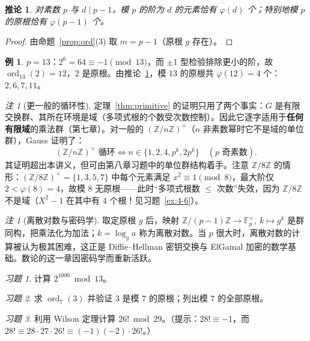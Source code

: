 \documentclass[a4paper,11pt]{ctexart}
\numberwithin{equation}{section}
\theoremstyle{plain}
\newtheorem{corollary}[theorem]{推论}
\theoremstyle{definition}
\newtheorem{example}[theorem]{例}
\theoremstyle{remark}
\newtheorem{remark}[theorem]{注}
\newtheorem{exercise}{习题}[section]
\newcommand{\Z}{\mathbb{Z}}
\newcommand{\F}{\mathbb{F}}
\DeclareMathOperator{\ord}{ord}
\begin{document}
\begin{corollary}\label{cor:countprim}
对素数 $p$ 与 $d\mid p-1$，模 $p$ 的阶为 $d$ 的元素恰有 $\varphi(d)$ 个；特别地模 $p$ 的原根恰有 $\varphi(p-1)$ 个。
\end{corollary}

\begin{proof}
由命题~\ref{prop:ord}(3) 取 $m=p-1$（原根 $g$ 存在）。
\end{proof}

\begin{example}
$p=13$：$2^6=64\equiv-1\pmod{13}$，而 $\pm1$ 型检验排除更小的阶，故 $\ord_{13}(2)=12$，$2$ 是原根。由推论~\ref{cor:countprim}，模 $13$ 的原根共 $\varphi(12)=4$ 个：$2,6,7,11$。
\end{example}

\begin{remark}[更一般的循环性]
定理~\ref{thm:primitive} 的证明只用了两个事实：$G$ 是有限交换群、其所在环境是域（多项式根的个数受次数控制）。因此它逐字适用于\textbf{任何有限域}的乘法群（第七章）。对一般的 $(\Z/n\Z)^{\times}$（$n$ 非素数幂时它不是域的单位群），Gauss 证明了：
\[
(\Z/n\Z)^{\times} \text{ 循环} \iff n\in\{1,2,4,p^k,2p^k\}\quad(p \text{ 奇素数}).
\]
其证明超出本讲义，但可由第八章习题中的单位群结构着手。注意 $\Z/8\Z$ 的情形：$(\Z/8\Z)^{\times}=\{1,3,5,7\}$ 中每个元素满足 $x^2\equiv1\pmod8$，最大阶仅 $2<\varphi(8)=4$，故模 $8$ 无原根——此时“多项式根数 $\le$ 次数”失效，因为 $\Z/8\Z$ 不是域（$X^2-1$ 在其中有 $4$ 个根！见习题~\ref{ex:4-6}）。
\end{remark}

\begin{remark}[离散对数与密码学]
取定原根 $g$ 后，映射 $\Z/(p-1)\Z\to\F_p^{\times},\ k\mapsto g^k$ 是群同构，把乘法化为加法；$k=\log_g a$ 称为离散对数。当 $p$ 很大时，离散对数的计算被认为极其困难，这正是 Diffie--Hellman 密钥交换与 ElGamal 加密的数学基础。数论的这一章因密码学而重新活跃。
\end{remark}

\begin{exercise}\label{ex:5-1}
计算 $2^{1000}\bmod 13$。
\end{exercise}

\begin{exercise}\label{ex:5-2}
求 $\ord_7(3)$ 并验证 $3$ 是模 $7$ 的原根；列出模 $7$ 的全部原根。
\end{exercise}

\begin{exercise}\label{ex:5-3}
利用 Wilson 定理计算 $26!\bmod 29$。（提示：$28!\equiv-1$，而 $28!\equiv 28\cdot27\cdot 26!\equiv(-1)(-2)\cdot26!$。）
\end{exercise}
\end{document}
